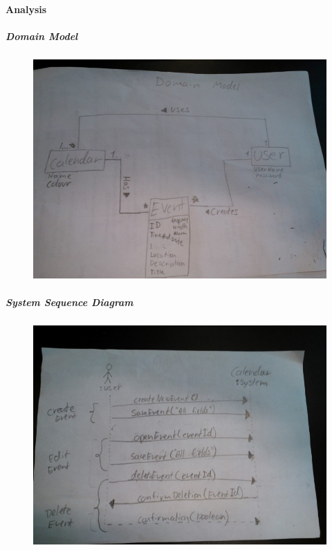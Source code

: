 \documentclass{article}
\begin{document}
  	\paragraph{Analysis} \mbox{}
  	
	
	\newpage
	\subparagraph{Domain Model} \mbox{}
	
	\begin{figure}[h]
	\caption{}
	\hspace{-50pt}   
   	\includegraphics[scale=.65]{LatexFiles/Analyze/DomainModel/DomainModel}
   	\end{figure}
	
\newpage
	\subparagraph{System Sequence Diagram} \mbox{}

	\begin{figure}[h]
	\caption{}   
   	\hspace{-50pt}
   	\includegraphics[scale=.65]{LatexFiles/Analyze/SystemSequenceDiagram/SSD}
   	\end{figure}
\end{document}
